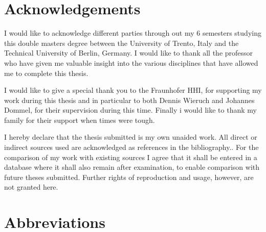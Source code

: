 \documentclass{article}
\begin{document}
\listoffigures
\listoftables

\newpage

\section*{Acknowledgements}
I would like to acknowledge different parties through out my 6 semesters studying this double masters degree between the University of Trento, Italy and the Technical University of Berlin, Germany. I would like to thank all the professor who have given me valuable insight into the various disciplines that have allowed me to complete this thesis. 

I would like to give a special thank you to the Fraunhofer HHI, for supporting my work during this thesis and in particular to both Dennis Wieruch and Johannes Dommel, for their supervision during this time. Finally i would like to thank my family for their support when times were tough.

I hereby declare that the thesis submitted is my own unaided work. All direct or indirect sources used are acknowledged as references in the bibliography..
For the comparison of my work with existing sources I agree that it shall be entered in a database where it shall also remain after examination, to enable comparison with future theses submitted. Further rights of reproduction and usage, however, are not granted here.
\newpage


\section*{Abbreviations}
\end{document}
